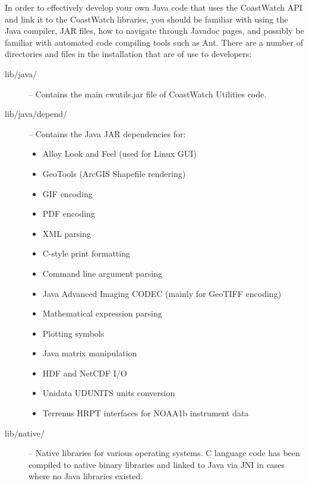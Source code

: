 In order to effectively develop your own Java code that uses the
CoastWatch API and link it to the CoastWatch libraries, you
should be familiar with using the Java compiler, JAR files, how
to navigate through Javadoc pages, and possibly be familiar with
automated code compiling tools such as Ant.  There are a number
of directories and files in the installation that are of use to
developers:
\begin{description}

\item[{\file lib/java/}] -- Contains the main {\file cwutils.jar} file of
CoastWatch Utilities code.

\item[{\file lib/java/depend/}] -- Contains the Java JAR dependencies for:
\begin{itemize}

\item Alloy Look and Feel (used for Linux GUI)
\item GeoTools (ArcGIS Shapefile rendering)
\item GIF encoding
\item PDF encoding
\item XML parsing
\item C-style print formatting
\item Command line argument parsing
\item Java Advanced Imaging CODEC (mainly for GeoTIFF encoding)
\item Mathematical expression parsing
\item Plotting symbols
\item Java matrix manipulation
\item HDF and NetCDF I/O
\item Unidata UDUNITS units conversion
\item Terrenus HRPT interfaces for NOAA1b instrument data

\end{itemize}

\item[{\file lib/native/}] -- Native libraries for various operating systems.
C language code has been compiled to native binary libraries and
linked to Java via JNI in cases where no Java libraries existed.

\end{description}

